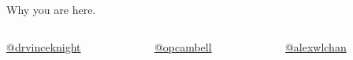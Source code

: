 \documentclass{beamer}
\begin{document}
    \begin{frame}
        \begin{center}
            \Huge

            Why you are here.

            \vspace{1cm}
            \Large

            \begin{columns}
                \begin{column}{.3\textwidth}
                    \href{https://twitter.com/drvinceknight}
                    {@drvinceknight}
                \end{column}


                \begin{column}{.3\textwidth}
                    \href{https://github.com/opcambell}
                    {@opcambell}
                \end{column}

                \begin{column}{.3\textwidth}
                    \href{https://github.com/alexwlchan}
                    {@alexwlchan}
                \end{column}

            \end{columns}

        \end{center}
    \end{frame}
\end{document}
